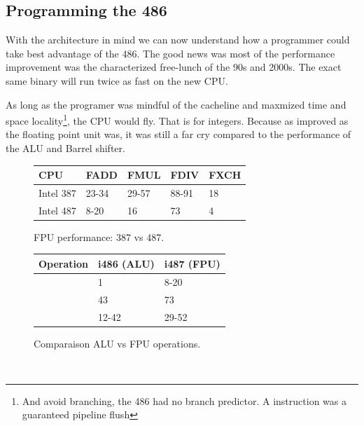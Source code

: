 \subsection{Programming the 486}
With the architecture in mind we can now understand how a programmer could take best advantage of the 486. The good news was most of the performance improvement was the characterized free-lunch of the 90s and 2000s. The exact same binary will run twice as fast on the new CPU.\\
\par
As long as the programer was mindful of the cacheline and maxmized time and space locality\footnote{And avoid branching, the 486 had no branch predictor. A  instruction was a guaranteed pipeline flush}, the CPU would fly. That is for integers. Because as improved as the floating point unit was, it was still a far cry compared to the performance of the ALU and Barrel shifter.\\
\par
\begin{figure}[H]
\centering
\begin{tabularx}{\textwidth}{ X  X X  X  X}
  \toprule
  \textbf{CPU} & \textbf{FADD} & \textbf{FMUL} & \textbf{FDIV} &\textbf{FXCH} \\ \bottomrule
Intel 387 & 23-34 & 29-57   & 88-91 & 18 \\
Intel 487 & 8-20  & 16   & 73 & 4 \\ \bottomrule
\end{tabularx}
\caption{FPU performance: 387 vs 487.}

\end{figure}




\par
 \begin{figure}[H]
\centering  
\begin{tabularx}{\textwidth}{ L{0.3} L{0.3} L{0.4}}
  \toprule
  \textbf{Operation} &  \textbf{i486 (ALU)} & \textbf{i487 (FPU)} \\
  \toprule 
   
    & 1 & 8-20\\
    & 43 & 73\\
    & 12-42 & 29-52\\
   \toprule
\end{tabularx}
\caption{Comparaison ALU vs FPU operations.}
\end{figure}
\par
{}\\
 \par


